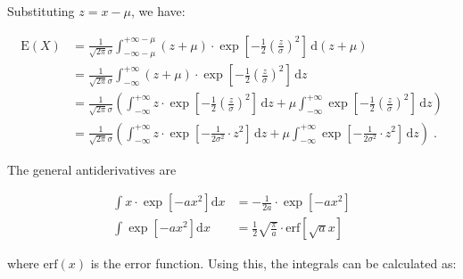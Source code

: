 \documentclass[a4paper,12pt,twoside]{book}
\begin{document}
Substituting $z = x -\mu$, we have:

\begin{equation} \label{eq:norm-mean-norm-mean-s2}
\begin{split}
\mathrm{E}(X) &= \frac{1}{\sqrt{2 \pi} \sigma} \int_{-\infty-\mu}^{+\infty-\mu} (z + \mu) \cdot \exp \left[ -\frac{1}{2} \left( \frac{z}{\sigma} \right)^2 \right] \, \mathrm{d}(z + \mu) \\
&= \frac{1}{\sqrt{2 \pi} \sigma} \int_{-\infty}^{+\infty} (z + \mu) \cdot \exp \left[ -\frac{1}{2} \left( \frac{z}{\sigma} \right)^2 \right] \, \mathrm{d}z \\
&= \frac{1}{\sqrt{2 \pi} \sigma} \left( \int_{-\infty}^{+\infty} z \cdot \exp \left[ -\frac{1}{2} \left( \frac{z}{\sigma} \right)^2 \right] \, \mathrm{d}z + \mu \int_{-\infty}^{+\infty} \exp \left[ -\frac{1}{2} \left( \frac{z}{\sigma} \right)^2 \right] \, \mathrm{d}z \right) \\
&= \frac{1}{\sqrt{2 \pi} \sigma} \left( \int_{-\infty}^{+\infty} z \cdot \exp \left[ -\frac{1}{2 \sigma^2} \cdot z^2 \right] \, \mathrm{d}z + \mu \int_{-\infty}^{+\infty} \exp \left[ -\frac{1}{2 \sigma^2} \cdot z^2 \right] \, \mathrm{d}z \right) \; .
\end{split}
\end{equation}

The general antiderivatives are

\begin{equation} \label{eq:norm-mean-exp-erf-anti-der}
\begin{split}
\int x \cdot \exp \left[ -a x^2 \right] \mathrm{d}x &= -\frac{1}{2a} \cdot \exp \left[ -a x^2 \right] \\
\int \exp \left[ -a x^2 \right] \mathrm{d}x &= \frac{1}{2} \sqrt{\frac{\pi}{a}} \cdot \mathrm{erf} \left[ \sqrt{a} x \right]
\end{split}
\end{equation}

where $\mathrm{erf}(x)$ is the error function. Using this, the integrals can be calculated as:
\end{document}
